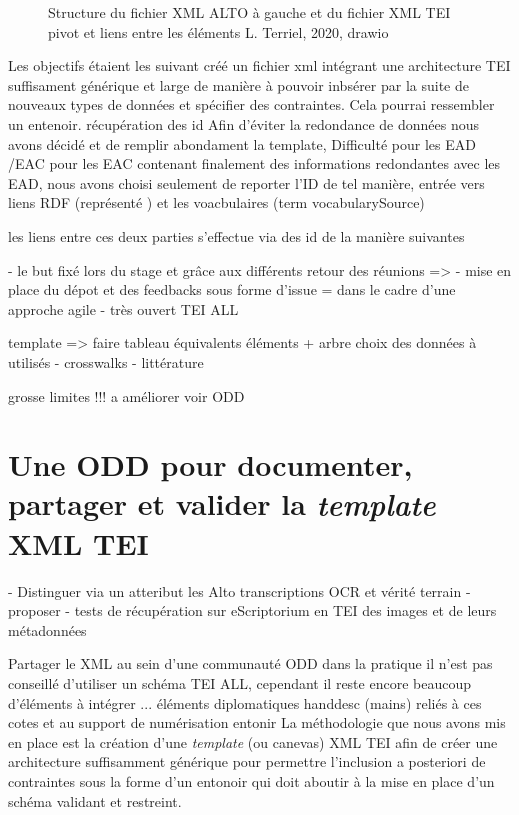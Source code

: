 \begin{figure}[h]
    \centering
    \centerline{}
    \caption{Structure du fichier XML ALTO à gauche et du fichier XML TEI pivot et liens entre les éléments \textcopyright L. Terriel, 2020, drawio}
    \label{fig:structure_arbre_tei_alto}
\end{figure}



  
Les objectifs étaient les suivant créé un fichier xml intégrant une architecture TEI suffisament générique et large de manière à pouvoir inbsérer par la suite de nouveaux types de données et spécifier des contraintes. Cela pourrai ressembler un entenoir. 
récupération des id
Afin d'éviter la redondance de données nous avons décidé et de remplir abondament la template, Difficulté pour les EAD /EAC pour les EAC contenant finalement des informations redondantes avec les EAD, nous avons choisi seulement de reporter l'ID de tel manière, entrée vers liens RDF (représenté ) et les voacbulaires (term vocabularySource)





les liens entre ces deux parties s'effectue via des id de la manière suivantes

- le but fixé lors du stage et grâce aux différents retour des réunions => 
- mise en place du dépot et des feedbacks sous forme d'issue = dans le cadre d'une approche agile
- très ouvert TEI ALL 

template => faire tableau équivalents éléments + arbre
choix des données à utilisés - crosswalks - littérature

grosse limites !!! 
a améliorer voir ODD 

\section{Une ODD pour documenter, partager et valider la \textit{template} XML TEI}


- Distinguer via un atteribut les Alto transcriptions OCR et vérité terrain 
- proposer 
- tests de récupération sur eScriptorium en TEI des images et de leurs métadonnées 


Partager le XML au sein d'une communauté ODD
dans la pratique il n'est pas conseillé d'utiliser un schéma TEI ALL, cependant il reste encore beaucoup d'éléments à intégrer ... éléments diplomatiques handdesc (mains) reliés à ces cotes et au support de numérisation 
entonir
La méthodologie que nous avons mis en place est la création d'une \textit{template} (ou canevas) XML TEI afin de créer une architecture suffisamment générique pour permettre l'inclusion a posteriori de contraintes sous la forme d'un entonoir qui doit aboutir à la mise en place d'un schéma validant et restreint. 

